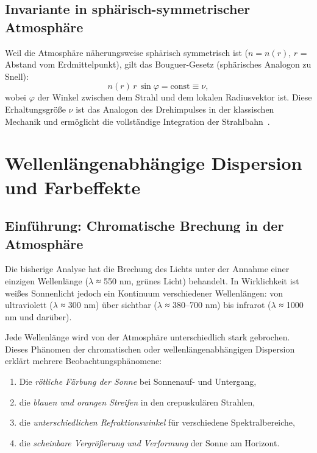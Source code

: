 \documentclass[12pt,a4paper]{article}
\begin{document}
\subsection{Invariante in sphärisch-symmetrischer Atmosphäre}

Weil die Atmosphäre näherungsweise sphärisch symmetrisch ist
($n = n(r)$, $r$ = Abstand vom Erdmittelpunkt),
gilt das Bouguer-Gesetz (sphärisches Analogon zu Snell):
\begin{equation}
  \boxed{n(r)\,r\,\sin\varphi = \mathrm{const} \equiv \nu,}
  \label{eq:bouguer}
\end{equation}
wobei $\varphi$ der Winkel zwischen dem Strahl und dem lokalen
Radiusvektor ist.
Diese Erhaltungsgröße $\nu$ ist das Analogon des Drehimpulses
in der klassischen Mechanik und ermöglicht die vollständige
Integration der Strahlbahn~\citep{Smart1977}.

\section{Wellenlängenabhängige Dispersion und Farbeffekte}
\label{sec:dispersion}

\subsection{Einführung: Chromatische Brechung in der Atmosphäre}

Die bisherige Analyse hat die Brechung des Lichts unter der Annahme
einer einzigen Wellenlänge ($\lambda$ ≈ 550 nm, grünes Licht) behandelt.
In Wirklichkeit ist weißes Sonnenlicht jedoch ein Kontinuum verschiedener
Wellenlängen: von ultraviolett ($\lambda$ ≈ 300 nm) über sichtbar
($\lambda$ ≈ 380–700 nm) bis infrarot ($\lambda$ ≈ 1000 nm und darüber).

Jede Wellenlänge wird von der Atmosphäre unterschiedlich stark gebrochen.
Dieses Phänomen der chromatischen oder wellenlängenabhängigen Dispersion
erklärt mehrere Beobachtungsphänomene:
\begin{enumerate}
	\item Die \emph{rötliche Färbung der Sonne} bei Sonnenauf- und Untergang,
	\item die \emph{blauen und orangen Streifen} in den crepuskulären Strahlen,
	\item die \emph{unterschiedlichen Refraktionswinkel} für verschiedene Spektralbereiche,
	\item die \emph{scheinbare Vergrößerung und Verformung} der Sonne am Horizont.
\end{enumerate}
\end{document}
